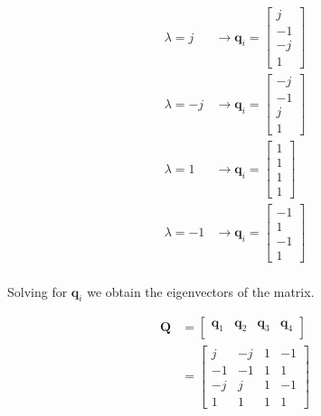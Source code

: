\begin{align*}
\lambda = j & \rightarrow \mathbf{q}_i = \begin{bmatrix}
                        j\\-1\\-j\\1
                        \end{bmatrix}\\
\lambda = -j & \rightarrow \mathbf{q}_i = \begin{bmatrix}
                        -j\\-1\\j\\1
                        \end{bmatrix}\\
\lambda = 1 & \rightarrow \mathbf{q}_i = \begin{bmatrix}
                        1\\1\\1\\1
                        \end{bmatrix}\\
\lambda = -1 & \rightarrow \mathbf{q}_i = \begin{bmatrix}
                        -1\\1\\-1\\1
                        \end{bmatrix}\\
\end{align*}

Solving for $\mathbf{q}_i$ we obtain the eigenvectors of the matrix.

\begin{align*}
\mathbf{Q} &= \begin{bmatrix}
               \mathbf{q}_1 &\mathbf{q}_2 & \mathbf{q}_3 & \mathbf{q}_4 \\
              \end{bmatrix}\\
            &= \begin{bmatrix}
                j & -j & 1 & -1\\
                -1 & -1 & 1 & 1\\
                -j & j & 1 & -1\\
                1 & 1 & 1 & 1
               \end{bmatrix}
\end{align*}

